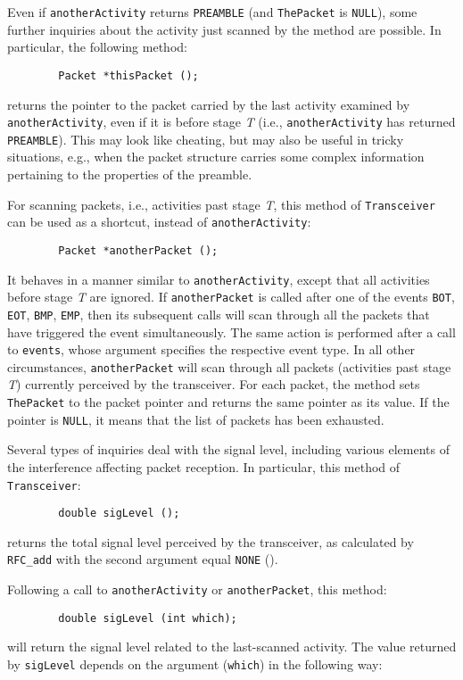 Even if {\tt anotherActivity} returns {\tt PREAMBLE} (and
{\tt ThePacket} is {\tt NULL}),
some further inquiries about the activity just scanned by the
method are possible.
In particular, the following method:
\begin{verbatim}
        Packet *thisPacket ();
\end{verbatim}
\noindent
returns the pointer to the packet carried by the last activity examined
by {\tt anotherActivity}, even if it is before stage {\em T\/} (i.e.,
{\tt anotherActivity} has returned {\tt PREAMBLE}).
This may look like cheating, but may also be useful in tricky situations,
e.g., when the
packet structure carries some complex information pertaining to the properties
of the preamble.

For scanning packets, i.e., activities past stage {\em T}, this method of
{\tt Transceiver} can be
used as a shortcut, instead of {\tt anotherActivity}:
\begin{verbatim}
        Packet *anotherPacket ();
\end{verbatim}
It behaves in a manner similar to {\tt anotherActivity}, except that all
activities before stage {\em T\/} are ignored.
If {\tt anotherPacket} is called after one of the events
{\tt BOT}, {\tt EOT}, {\tt BMP}, {\tt EMP},
then its subsequent calls will scan through all the packets that have
triggered the event simultaneously.
The same action is performed after a call to {\tt events}, whose argument
specifies the respective event type.
In all other circumstances, {\tt anotherPacket} will scan through all packets
(activities past stage {\em T\/}) currently perceived by the
transceiver.
For each packet, the method sets {\tt ThePacket} to the packet pointer and
returns the same pointer as its value.
If the pointer is {\tt NULL}, it means that the list of
packets has been exhausted.

Several types of inquiries deal with the signal level, including various
elements of the interference affecting packet reception.
In particular, this method of {\tt Transceiver}:
\begin{verbatim}
        double sigLevel ();
\end{verbatim}
\noindent
returns the total signal level perceived by the transceiver, as calculated
by {\tt RFC\_add} with the second argument equal {\tt NONE}
().

Following a call to {\tt anotherActivity} or {\tt anotherPacket}, this method:
\begin{verbatim}
        double sigLevel (int which);
\end{verbatim}
\noindent
will return the signal level related to the last-scanned activity.
The value returned by {\tt sigLevel} depends on the argument 
({\tt which}) in the following way:

